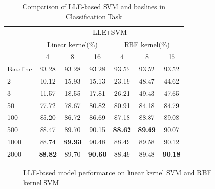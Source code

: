 \documentclass{article}
\begin{document}
\begin{table}[htbp]
	\centering
	\newcommand{\tabincell}[2]{\begin{tabular}{@{}#1@{}}#2\end{tabular}}
	\renewcommand\arraystretch{1.0}
	\caption{Comparison of LLE-based SVM and baslines in Classification Task}
	\label{baselin4}%
	\begin{tabular}{@{}p{2.5cm}<{\centering}|c|c|c|c|c|c}
		\hline
		\multirow{3}{*}{\diagbox[height=3\line,width=2.9cm,font=\tiny]{$\#neigh.$}{Acc.}{$\mathit{M}$}} &\multicolumn{6}{c}{LLE+SVM}\\
		\cline{2-7}
		 & \multicolumn{3}{c|}{Linear kernel(\%)} & \multicolumn{3}{c}{RBF kernel(\%)}\\
		\cline{2-7}
		 & 4 & 8 & 16 & 4 & 8 & 16\\
		\hline
		Baseline & 93.28 & 93.28 & 93.28 & 93.52 & 93.52 & 93.52\\
		\hline
		2   & 10.12 & 15.93 & 15.13 & 23.19 & 48.47 & 44.62\\
		\hline
		3   & 11.57 & 18.55 & 17.81 & 26.21 & 49.43 & 47.65\\
		\hline
		50   & 77.72 & 78.67 & 80.82 & 80.91 & 84.18 & 84.79\\
		\hline
		100   & 85.20 & 86.72 & 86.69 & 87.18 & 88.87 & 89.08\\
		\hline
		500   & 88.47 & 89.70 & 90.15 & \textbf{88.62} & \textbf{89.69} & 90.07\\
		\hline
		1000   & 88.74 & \textbf{89.93} & 90.48 & 88.49 & 89.58 & 90.12\\
		\hline
		2000   & \textbf{88.82} & 89.70 & \textbf{90.60} & 88.49 & 89.48 & \textbf{90.18}\\
		\hline
	\end{tabular}
\end{table}

\begin{center}
\begin{figure}[htbp]
\centering
{}
\quad
{}
\caption{LLE-based model performance on linear kernel SVM and RBF kernel SVM}
\label{Fig8}
\end{figure}
\end{center}
\end{document}
